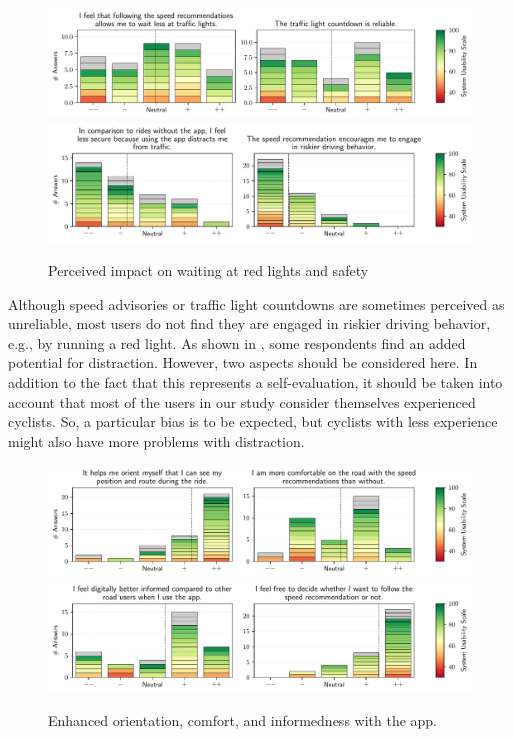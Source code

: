 \begin{figure}[t]
\caption{Perceived impact on waiting at red lights and safety}\label{fig:waiting-time-at-traffic-lights}
\includegraphics[width=\linewidth]{images/app-usability-questions-waiting-time-at-traffic-lights.pdf} 
\\
\includegraphics[width=\linewidth]{images/app-usability-questions-app-impact-on-safety.pdf}
\end{figure}

Although speed advisories or traffic light countdowns are sometimes perceived as unreliable, most users do not find they are engaged in riskier driving behavior, e.g., by running a red light. As shown in , some respondents find an added potential for distraction. However, two aspects should be considered here. In addition to the fact that this represents a self-evaluation, it should be taken into account that most of the users in our study consider themselves experienced cyclists. So, a particular bias is to be expected, but cyclists with less experience might also have more problems with distraction.

\begin{figure}[t]
\caption{Enhanced orientation, comfort, and informedness with the app.}\label{fig:app-enhanced-orientation}
\includegraphics[width=\linewidth]{images/app-usability-questions-app-enhanced-orientation.pdf}
\\
\includegraphics[width=\linewidth]{images/app-usability-questions-app-informedness-freedom.pdf}
\end{figure}


